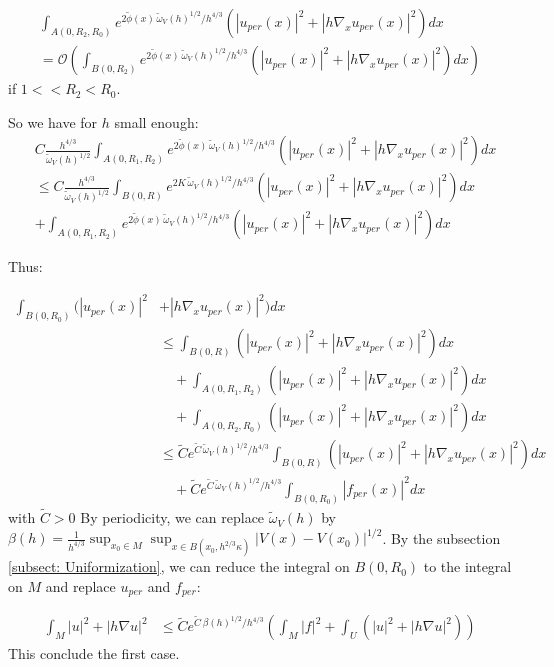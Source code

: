\documentclass[leqno,11pt,letterpaper, english]{amsart}
\newcommand{\nn}{\nonumber}
\theoremstyle{plain}
\theoremstyle{definition}
\numberwithin{equation}{section}
\begin{document}
\begin{align}
	\int_{A(0,R_2,R_0)} e^{2\tilde{\phi}(x)\,\tilde{\omega}_V(h)^{1/2}/ h^{4/3}} (|u_{per}(x)|^2 +|h\nabla_x u_{per}(x)|^2)dx\nn\\
	= \mathcal{O}\left(\int_{B(0,R_2)} e^{2\tilde{\phi}(x)\,\tilde{\omega}_V(h)^{1/2}/ h^{4/3}} (|u_{per}(x)|^2 +|h\nabla_x u_{per}(x)|^2)dx\right)
\end{align}
if $1<<R_2<R_0$.

So we have for $h$ small enough:
\begin{align}
    &C \frac{h^{4/3}}{\tilde{\omega}_V(h)^{1/2}}\int_{A(0,R_1,R_2)} e^{2\tilde{\phi}(x)\,\tilde{\omega}_V(h)^{1/2}/ h^{4/3}} (|u_{per}(x)|^2 +|h\nabla_x u_{per}(x)|^2)dx \nn\\
    &\leq C \frac{h^{4/3}}{\tilde{\omega}_V(h)^{1/2}}\int_{B(0,R)} e^{2K\,\tilde{\omega}_V(h)^{1/2}/ h^{4/3}} (|u_{per}(x)|^2 +|h\nabla_x u_{per}(x)|^2)dx\nn\\
    &+\int_{A(0,R_1,R_2)} e^{2\tilde{\phi}(x)\,\tilde{\omega}_V(h)^{1/2}/ h^{4/3}} (|u_{per}(x)|^2 +|h\nabla_x u_{per}(x)|^2)dx
\end{align}

Thus:

\begin{align}
\int_{B(0,R_0)} (|u_{per}(x)|^2 &+|h\nabla_x u_{per}(x)|^2)dx \ \nn\\
&\leq \int_{B(0,R)} (|u_{per}(x)|^2 +|h\nabla_x u_{per}(x)|^2)dx\nn\\
&\quad + \int_{A(0,R_1,R_2)} (|u_{per}(x)|^2 +|h\nabla_x u_{per}(x)|^2)dx\nn\\
&\quad +\int_{A(0,R_2,R_0)} (|u_{per}(x)|^2 +|h\nabla_x u_{per}(x)|^2)dx\nn\\
&\leq \tilde{C} e^{\tilde{C}\,\tilde{\omega}_V(h)^{1/2}/ h^{4/3}} \int_{B(0,R)}  (|u_{per}(x)|^2 +|h\nabla_x u_{per}(x)|^2)dx\nn\\
&\quad + \tilde{C} e^{\tilde{C}\,\tilde{\omega}_V(h)^{1/2}/ h^{4/3}}\int_{B(0,R_0)} |f_{per}(x)|^2dx
\end{align}
with $\tilde{C}>0$
By periodicity, we can replace $\tilde{\omega}_V(h)$ by $\beta(h)= \frac{1}{h^{4/3}}\sup_{x_0\in M}\sup_{x\in B(x_0,h^{2/3}\kappa)}|V(x)-V(x_0)|^{1/2}$. By the subsection \ref{subsect: Uniformization}, we can reduce the integral on $B(0,R_0)$ to the integral on $M$ and replace $u_{per}$ and $f_{per}$:

\begin{align}
\int_{M}|u|^2+|h\nabla u|^2&\leq \tilde{C} e^{\tilde{C}\,\beta(h)^{1/2}/ h^{4/3}}\left(\int_{M} |f|^2+\int_{U} (|u|^2 +|h\nabla u|^2)\right)
\end{align}
This conclude the first case.
\end{document}

